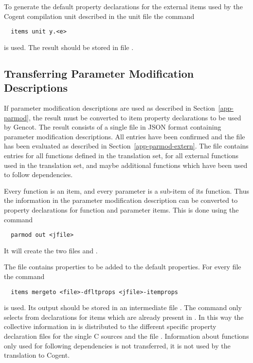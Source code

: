 To generate the default property declarations for the external items used by the Cogent compilation unit described in the 
unit file  the command
\begin{verbatim}
  items unit y.<e>
\end{verbatim}
is used. The result should be stored in file .

\subsection{Transferring Parameter Modification Descriptions}
\label{app-items-parmod}

If parameter modification descriptions are used as described in Section~\ref{app-parmod}, the result must be converted to item
property declarations to be used by Gencot. The result consists of a single file  in JSON format containing 
parameter modification descriptions. All entries have been confirmed and the file has been evaluated as described in 
Section~\ref{app-parmod-extern}. The file contains entries for all functions defined in the translation set, for all external 
functions used in the translation set, and maybe additional functions which have been used to follow dependencies.

Every function is an item, and every parameter is a sub-item of its function. Thus the information in the parameter modification
description can be converted to property declarations for function and parameter items. This is done using the command
\begin{verbatim}
  parmod out <jfile>
\end{verbatim}
It will create the two files  and . 

The file  contains properties to be added to the default properties. For every file 
the command 
\begin{verbatim}
  items mergeto <file>-dfltprops <jfile>-itemprops
\end{verbatim}
is used. Its output should be stored in an intermediate file . The command only selects from 
 declarations for items which are already present in
. In this way the collective information in  is distributed to the different
specific property declaration files for the single C sources and the file . Information about functions
only used for following dependencies is not transferred, it is not used by the translation to Cogent.

